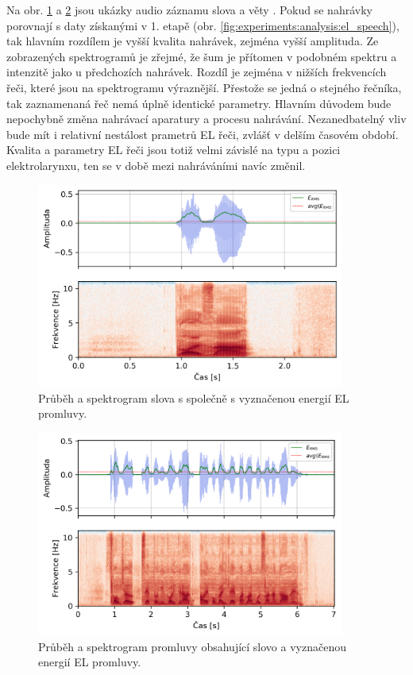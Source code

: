 Na obr. \ref{fig:experiments:normalization:word} a \ref{fig:experiments:normalization:sentence} jsou ukázky audio záznamu slova  a věty . Pokud se nahrávky porovnají s daty získanými v 1. etapě (obr. \ref{fig:experiments:analysis:el_speech}), tak hlavním rozdílem je vyšší kvalita nahrávek, zejména vyšší amplituda. Ze zobrazených spektrogramů je zřejmé, že šum je přítomen v podobném spektru a intenzitě jako u předchozích nahrávek. Rozdíl je zejména v nižších frekvencích řeči, které jsou na spektrogramu výraznější. Přestože se jedná o stejného řečníka, tak zaznamenaná řeč nemá úplně identické parametry. Hlavním důvodem bude nepochybně změna nahrávací aparatury a procesu nahrávání. Nezanedbatelný vliv bude mít i relativní nestálost prametrů EL řeči, zvlášť v delším časovém období. Kvalita a parametry EL řeči jsou totiž velmi závislé na typu a pozici elektrolarynxu, ten se v době mezi nahráváními navíc změnil.

\begin{figure}[hbpt]
  \centering
  \includegraphics[width=0.9\textwidth]{./ch4-experiments/img/energy_spec_word.png}
  \caption{Průběh a spektrogram slova  s společně s vyznačenou energií EL promluvy.}
  \label{fig:experiments:normalization:word}
\end{figure}

\begin{figure}[hbpt]
  \centering
  \includegraphics[width=0.9\textwidth]{./ch4-experiments/img/energy_spec_sentence.png}
  \caption{Průběh a spektrogram promluvy obsahující slovo  a vyznačenou energií EL promluvy.}
  \label{fig:experiments:normalization:sentence}
\end{figure}

